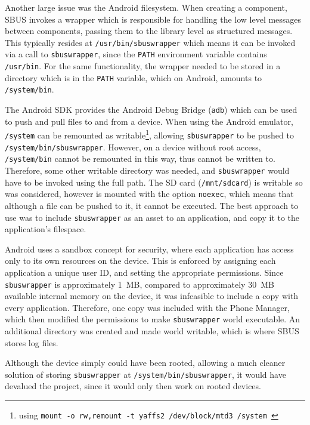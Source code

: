 \documentclass[12pt,twoside,notitlepage]{report}
\begin{document}
Another large issue was the Android filesystem. 
When creating a component, SBUS invokes a wrapper which is responsible for handling the low level messages between components, passing them to the library level as structured messages.
This typically resides at {\tt /usr/bin/sbuswrapper} which means it can be invoked via a call to {\tt sbuswrapper}, since the {\tt PATH} environment variable contains {\tt /usr/bin}. 
For the same functionality, the wrapper needed to be stored in a directory which is in the {\tt PATH} variable, which on Android, amounts to {\tt /system/bin}. 

The Android SDK provides the Android Debug Bridge ({\tt adb}) which can be used to push and pull files to and from a device. 
When using the Android emulator, {\tt /system} can be remounted as writable\footnote{using {\tt mount -o rw,remount -t yaffs2 /dev/block/mtd3 /system }}, allowing {\tt sbuswrapper} to be pushed to {\tt /system/bin/sbuswrapper}. 
However, on a device without root access, {\tt /system/bin} cannot be remounted in this way, thus cannot be written to. 
Therefore, some other writable directory was needed, and {\tt sbuswrapper} would have to be invoked using the full path. 
The SD card ({\tt /mnt/sdcard}) is writable so was considered, however is mounted with the option {\tt noexec}, which means that although a file can be pushed to it, it cannot be executed. 
The best approach to use was to include {\tt sbuswrapper} as an asset to an application, and copy it to the application's filespace.

Android uses a sandbox concept for security, where each application has access only to its own resources on the device. 
This is enforced by assigning each application a unique user ID, and setting the appropriate permissions. 
Since {\tt sbuswrapper} is approximately \SI{1}{MB}, compared to approximately \SI{30}{MB} available internal memory on the device, it was infeasible to include a copy with every application. 
Therefore, one copy was included with the Phone Manager, which then modified the permissions to make {\tt sbuswrapper} world executable. 
An additional directory was created and made world writable, which is where SBUS stores log files. 

Although the device simply could have been rooted, allowing a much cleaner solution of storing {\tt sbuswrapper} at {\tt /system/bin/sbuswrapper}, it would have devalued the project, since it would only then work on rooted devices.

\end{document}
